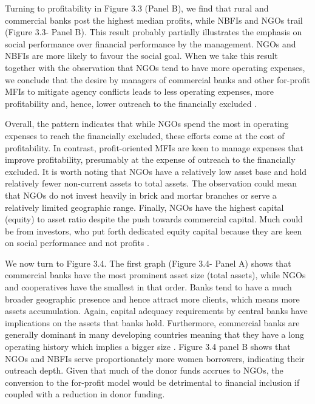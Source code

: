 \documentclass[a4paper, nobind]{templates/ociamthesis}
\begin{document}
Turning to profitability in Figure 3.3 (Panel B), we find that rural and commercial banks post the highest median profits, while NBFIs and NGOs trail (Figure 3.3- Panel B). This result probably partially illustrates the emphasis on social performance over financial performance by the management. NGOs and NBFIs are more likely to favour the social goal. When we take this result together with the observation that NGOs tend to have more operating expenses, we conclude that the desire by managers of commercial banks and other for-profit MFIs to mitigate agency conflicts leads to less operating expenses, more profitability and, hence, lower outreach to the financially excluded \autocite{jensen1976theory}.

Overall, the pattern indicates that while NGOs spend the most in operating expenses to reach the financially excluded, these efforts come at the cost of profitability. In contrast, profit-oriented MFIs are keen to manage expenses that improve profitability, presumably at the expense of outreach to the financially excluded. It is worth noting that NGOs have a relatively low asset base and hold relatively fewer non-current assets to total assets. The observation could mean that NGOs do not invest heavily in brick and mortar branches or serve a relatively limited geographic range. Finally, NGOs have the highest capital (equity) to asset ratio despite the push towards commercial capital. Much could be from investors, who put forth dedicated equity capital because they are keen on social performance and not profits \autocite{mia2017mission}.

We now turn to Figure 3.4. The first graph (Figure 3.4- Panel A) shows that commercial banks have the most prominent asset size (total assets), while NGOs and cooperatives have the smallest in that order. Banks tend to have a much broader geographic presence and hence attract more clients, which means more assets accumulation. Again, capital adequacy requirements by central banks have implications on the assets that banks hold. Furthermore, commercial banks are generally dominant in many developing countries meaning that they have a long operating history which implies a bigger size \autocite{levine2002bank}. Figure 3.4 panel B shows that NGOs and NBFIs serve proportionately more women borrowers, indicating their outreach depth. Given that much of the donor funds accrues to NGOs, the conversion to the for-profit model would be detrimental to financial inclusion if coupled with a reduction in donor funding.
\end{document}

